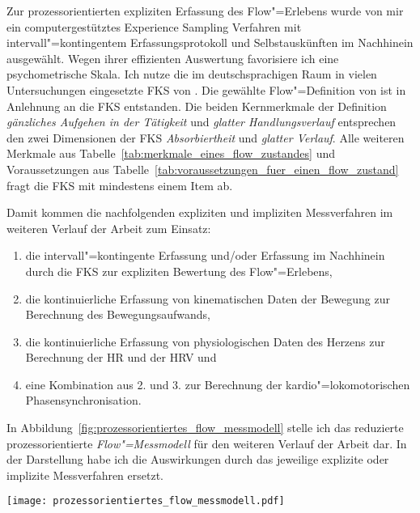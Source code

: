 Zur prozessorientierten expliziten Erfassung des Flow"=Erlebens wurde von mir ein computergestütztes Experience Sampling Verfahren mit intervall"=kontingentem Erfassungsprotokoll und Selbstauskünften im Nachhinein ausgewählt. Wegen ihrer effizienten Auswertung favorisiere ich eine psychometrische Skala. Ich nutze die im deutschsprachigen Raum in vielen Untersuchungen eingesetzte \ac{FKS} von \citet{Rheinberg2003}. Die gewählte Flow"=Definition von \citet{Henk2014} ist in Anlehnung an die \ac{FKS} entstanden. Die beiden Kernmerkmale der Definition \emph{gänzliches Aufgehen in der Tätigkeit} und \emph{glatter Handlungsverlauf} entsprechen den zwei Dimensionen der \ac{FKS} \emph{Absorbiertheit} und \emph{glatter Verlauf}. Alle weiteren Merkmale aus Tabelle~\ref{tab:merkmale_eines_flow_zustandes} und Voraussetzungen aus Tabelle~\ref{tab:voraussetzungen_fuer_einen_flow_zustand} fragt die \ac{FKS} mit mindestens einem Item ab. 

Damit kommen die nachfolgenden expliziten und impliziten Messverfahren im weiteren Verlauf der Arbeit zum Einsatz:
\begin{enumerate}
	
	\item die intervall"=kontingente Erfassung und/oder Erfassung im Nachhinein durch die \ac{FKS} zur expliziten Bewertung des Flow"=Erlebens,

	\item die kontinuierliche Erfassung von kinematischen Daten der Bewegung zur Berechnung des Bewegungsaufwands, 

	\item die kontinuierliche Erfassung von physiologischen Daten des Herzens zur Berechnung der \ac{HR} und der \acs{HRV} und

	\item eine Kombination aus 2. und 3. zur Berechnung der kardio"=lokomotorischen Phasensynchronisation.
\end{enumerate}

In Abbildung~\ref{fig:prozessorientiertes_flow_messmodell} stelle ich das reduzierte prozessorientierte \emph{Flow"=Messmodell} für den weiteren Verlauf der Arbeit dar. In der Darstellung habe ich die Auswirkungen durch das jeweilige explizite oder implizite Messverfahren ersetzt. 
\begin{sidewaysfigure}
	\texttt{[image: prozessorientiertes\_flow\_messmodell.pdf]} \caption[Das prozessorientierte Flow"=Messmodell für die Entwicklung eines impliziten Messverfahrens des Flow"=Erlebens]{Das prozessorientierte Flow"=Messmodell für die Entwicklung eines impliziten Messverfahrens des Flow"=Erlebens -- die Auswirkungen wurden durch das jeweilige explizite oder implizite Messverfahren ersetzt. Die explizite Befragung durch die \ac{FKS} findet nicht mehr im Prozess statt.} \label{fig:prozessorientiertes_flow_messmodell} 
\end{sidewaysfigure}

